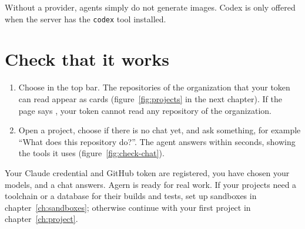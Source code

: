 Without a provider, agents simply do not generate images. Codex is only offered when the server
has the \texttt{codex} tool installed.


\section{Check that it works}\label{sec:check-accounts}

\begin{enumerate}
  \item Choose  in the top bar. The repositories of the organization that your token
    can read appear as cards (figure~\ref{fig:projects} in the next chapter). If the page says
    , your token cannot read any repository of the organization.
  \item Open a project, choose  if there is no chat yet, and ask something, for
    example ``What does this repository do?''. The agent answers within seconds, showing the
    tools it uses (figure~\ref{fig:check-chat}).
\end{enumerate}


\whatyouhave
Your Claude credential and GitHub token are registered, you have chosen your models, and a chat
answers. Agern is ready for real work. If your projects need a toolchain or a database for their
builds and tests, set up sandboxes in chapter~\ref{ch:sandboxes}; otherwise continue with your
first project in chapter~\ref{ch:project}.
